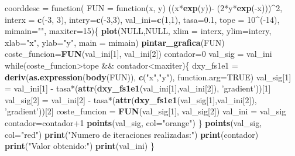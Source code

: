\documentclass[]{article}
\newenvironment{Shaded}{\begin{snugshade}}{\end{snugshade}}
\newcommand{\KeywordTok}[1]{\textcolor[rgb]{0.13,0.29,0.53}{\textbf{{#1}}}}
\newcommand{\DataTypeTok}[1]{\textcolor[rgb]{0.13,0.29,0.53}{{#1}}}
\newcommand{\DecValTok}[1]{\textcolor[rgb]{0.00,0.00,0.81}{{#1}}}
\newcommand{\FloatTok}[1]{\textcolor[rgb]{0.00,0.00,0.81}{{#1}}}
\newcommand{\StringTok}[1]{\textcolor[rgb]{0.31,0.60,0.02}{{#1}}}
\newcommand{\OtherTok}[1]{\textcolor[rgb]{0.56,0.35,0.01}{{#1}}}
\newcommand{\NormalTok}[1]{{#1}}
\begin{document}
\begin{Shaded}
\begin{Highlighting}[]
\NormalTok{coorddesc =}\StringTok{ }\NormalTok{function(}
  \DataTypeTok{FUN =} \NormalTok{function(x, y) ((x*}\KeywordTok{exp}\NormalTok{(y))-}\StringTok{ }\NormalTok{(}\DecValTok{2}\NormalTok{*y*}\KeywordTok{exp}\NormalTok{(-x)))^}\DecValTok{2}\NormalTok{, }\DataTypeTok{interx =} \KeywordTok{c}\NormalTok{(-}\DecValTok{3}\NormalTok{, }\DecValTok{3}\NormalTok{), }\DataTypeTok{intery=}\KeywordTok{c}\NormalTok{(-}\DecValTok{3}\NormalTok{,}\DecValTok{3}\NormalTok{),}
  \DataTypeTok{val_ini=}\KeywordTok{c}\NormalTok{(}\DecValTok{1}\NormalTok{,}\DecValTok{1}\NormalTok{), }\DataTypeTok{tasa=}\FloatTok{0.1}\NormalTok{, }\DataTypeTok{tope =} \DecValTok{10}\NormalTok{^(-}\DecValTok{14}\NormalTok{), }\DataTypeTok{mimain=}\StringTok{""}\NormalTok{, }\DataTypeTok{maxiter=}\DecValTok{15}\NormalTok{)\{}
  \KeywordTok{plot}\NormalTok{(}\OtherTok{NULL}\NormalTok{,}\OtherTok{NULL}\NormalTok{, }\DataTypeTok{xlim =} \NormalTok{interx, }\DataTypeTok{ylim=}\NormalTok{intery, }\DataTypeTok{xlab=}\StringTok{"x"}\NormalTok{, }\DataTypeTok{ylab=}\StringTok{"y"}\NormalTok{, }\DataTypeTok{main =} \NormalTok{mimain)}
  \KeywordTok{pintar_grafica}\NormalTok{(FUN)}
  \NormalTok{coste_funcion=}\KeywordTok{FUN}\NormalTok{(val_ini[}\DecValTok{1}\NormalTok{], val_ini[}\DecValTok{2}\NormalTok{])}
  \NormalTok{contador=}\DecValTok{0}
  \NormalTok{val_sig =}\StringTok{ }\NormalTok{val_ini}
  \NormalTok{while(coste_funcion>tope &&}\StringTok{ }\NormalTok{contador<maxiter)\{}
    \NormalTok{dxy_fs1e1 =}\StringTok{ }\KeywordTok{deriv}\NormalTok{(}\KeywordTok{as.expression}\NormalTok{(}\KeywordTok{body}\NormalTok{(FUN)), }\KeywordTok{c}\NormalTok{(}\StringTok{"x"}\NormalTok{,}\StringTok{"y"}\NormalTok{), }\DataTypeTok{function.arg=}\OtherTok{TRUE}\NormalTok{)}
    \NormalTok{val_sig[}\DecValTok{1}\NormalTok{] =}\StringTok{ }\NormalTok{val_ini[}\DecValTok{1}\NormalTok{] -}\StringTok{ }\NormalTok{tasa*(}\KeywordTok{attr}\NormalTok{(}\KeywordTok{dxy_fs1e1}\NormalTok{(val_ini[}\DecValTok{1}\NormalTok{],val_ini[}\DecValTok{2}\NormalTok{]), }\StringTok{'gradient'}\NormalTok{))[}\DecValTok{1}\NormalTok{]}
    \NormalTok{val_sig[}\DecValTok{2}\NormalTok{] =}\StringTok{ }\NormalTok{val_ini[}\DecValTok{2}\NormalTok{] -}\StringTok{ }\NormalTok{tasa*(}\KeywordTok{attr}\NormalTok{(}\KeywordTok{dxy_fs1e1}\NormalTok{(val_sig[}\DecValTok{1}\NormalTok{],val_ini[}\DecValTok{2}\NormalTok{]), }\StringTok{'gradient'}\NormalTok{))[}\DecValTok{2}\NormalTok{]}
    \NormalTok{coste_funcion =}\StringTok{ }\KeywordTok{FUN}\NormalTok{(val_sig[}\DecValTok{1}\NormalTok{], val_sig[}\DecValTok{2}\NormalTok{])}
    \NormalTok{val_ini =}\StringTok{ }\NormalTok{val_sig}
    \NormalTok{contador=contador}\DecValTok{+1}
    \KeywordTok{points}\NormalTok{(val_sig, }\DataTypeTok{col=}\StringTok{"orange"}\NormalTok{)}
  \NormalTok{\}}
  \KeywordTok{points}\NormalTok{(val_sig, }\DataTypeTok{col=}\StringTok{"red"}\NormalTok{)}
  \KeywordTok{print}\NormalTok{(}\StringTok{"Numero de iteraciones realizadas:"}\NormalTok{)}
  \KeywordTok{print}\NormalTok{(contador)}
  \KeywordTok{print}\NormalTok{(}\StringTok{"Valor obtenido:"}\NormalTok{)}
  \KeywordTok{print}\NormalTok{(val_ini)}
\NormalTok{\}}


\end{Highlighting}
\end{Shaded}
\end{document}
